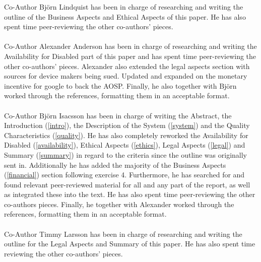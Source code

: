 \documentclass[conference]{IEEEtran}
\begin{document}
Co-Author Björn Lindquist has been in charge of researching and writing the outline of the Business Aspects and Ethical Aspects of this paper. He has also spent time peer-reviewing the other co-authors' pieces.
\\\\Co-Author Alexander Anderson has been in charge of researching and writing the Availability for Disabled part of this paper and has spent time peer-reviewing the other co-authors' pieces. Alexander also extended the legal aspects section with sources for device makers being sued. Updated and expanded on the monetary incentive for google to back the AOSP. Finally, he also together with Björn worked through the references, formatting them in an acceptable format. 
\\\\Co-Author Björn Isacsson has been in charge of writing the Abstract, the Introduction (\ref{intro}), the Description of the System (\ref{system}) and the Quality Characteristics (\ref{quality}). He has also completely reworked the Availability for Disabled (\ref{availability}), Ethical Aspects (\ref{ethics}), Legal Aspects (\ref{legal}) and Summary (\ref{summary}) in regard to the criteria since the outline was originally sent in. Additionally he has added the majority of the Business Aspects (\ref{financial}) section following exercise 4. Furthermore, he has searched for and found relevant peer-reviewed material for all and any part of the report, as well as integrated these into the text. He has also spent time peer-reviewing the other co-authors pieces. Finally, he together with Alexander worked through the references, formatting them in an acceptable format.
\\\\Co-Author Timmy Larsson has been in charge of researching and writing the outline for the Legal Aspects and Summary of this paper. He has also spent time reviewing the other co-authors' pieces.
\end{document}
